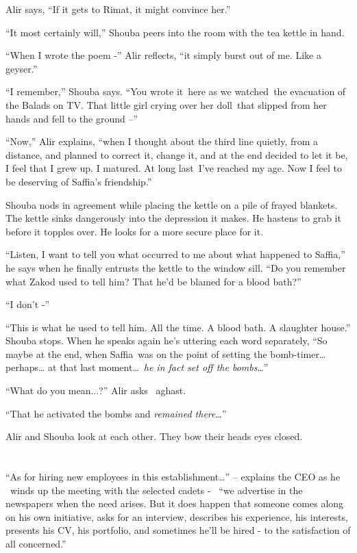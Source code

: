 \documentclass[twoside,11pt]{book}
\begin{document}
Alir says, ``If it gets to Rimat, it might convince her.''

``It most certainly will,'' Shouba peers into the room with the tea kettle in hand.

``When I wrote the poem -'' Alir reflects, ``it simply burst out of me. Like a geyser.''

``I remember,'' Shouba says. ``You wrote it~here as we watched~the evacuation of
the Balads on TV. That little girl crying over her doll~that slipped from her hands and fell to the ground
--''

``Now,'' Alir explains, ``when I thought about the third line quietly, from a
distance, and planned to correct it, change it, and at the end decided to let it be, I feel that I grew up. I matured.
At long last~I've reached my age. Now I feel to be deserving of Saffia's friendship.''

Shouba nods in agreement while placing the kettle on a pile of frayed blankets. The kettle sinks dangerously into the
depression it makes. He hastens to grab it before it topples over. He looks for a more secure place for it.

``Listen, I want to tell you what occurred to me about what happened to Saffia,'' he says when
he finally entrusts the kettle to the window sill. ``Do you remember what Zakod used to tell him? That
he'd be blamed for a blood bath?''

``I don't -''

``This is what he used to tell him. All the time. A blood bath. A slaughter house.'' Shouba
stops. When he speaks again he's uttering each word separately, ``So maybe at the end, when Saffia~was on
the point of setting the bomb-timer{\dots} perhaps{\dots} at that last moment{\dots}~\textit{he in fact set off the
bombs}{\dots}''

``What do you mean...?'' Alir asks \ aghast.

``That he activated the bombs and \textit{remained there}{\dots}''

Alir and Shouba look at each other. They bow their heads eyes closed.


\bigskip

\chapter{}

``As for hiring new employees in this establishment{\dots}'' -- explains the CEO as he \ winds up the
meeting with the selected cadets - \ {}``we advertise in the newspapers when the need arises. But it does happen that
someone comes along on his own initiative, asks for an interview, describes his experience, his interests, presents his
CV, his portfolio, and sometimes he'll be hired - to the satisfaction of all concerned.''
\end{document}
